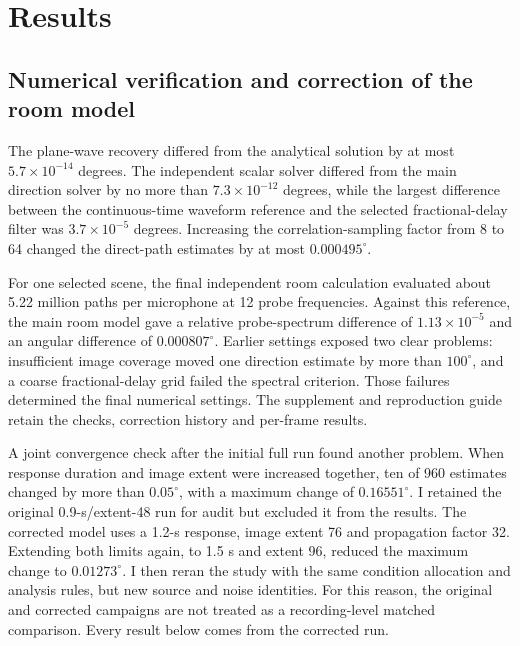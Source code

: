 \documentclass{edpsci}
\begin{document}
\section{Results}

\subsection{Numerical verification and correction of the room model}

The plane-wave recovery differed from the analytical solution by at most $5.7\times10^{-14}$ degrees. The independent scalar solver differed from the main direction solver by no more than $7.3\times10^{-12}$ degrees, while the largest difference between the continuous-time waveform reference and the selected fractional-delay filter was $3.7\times10^{-5}$ degrees. Increasing the correlation-sampling factor from 8 to 64 changed the direct-path estimates by at most $0.000495^\circ$.

For one selected scene, the final independent room calculation evaluated about 5.22 million paths per microphone at 12 probe frequencies. Against this reference, the main room model gave a relative probe-spectrum difference of $1.13\times10^{-5}$ and an angular difference of $0.000807^\circ$. Earlier settings exposed two clear problems: insufficient image coverage moved one direction estimate by more than $100^\circ$, and a coarse fractional-delay grid failed the spectral criterion. Those failures determined the final numerical settings. The supplement and reproduction guide retain the checks, correction history and per-frame results.

A joint convergence check after the initial full run found another problem. When response duration and image extent were increased together, ten of 960 estimates changed by more than $0.05^\circ$, with a maximum change of $0.16551^\circ$. I retained the original 0.9-s/extent-48 run for audit but excluded it from the results. The corrected model uses a 1.2-s response, image extent 76 and propagation factor 32. Extending both limits again, to 1.5 s and extent 96, reduced the maximum change to $0.01273^\circ$. I then reran the study with the same condition allocation and analysis rules, but new source and noise identities. For this reason, the original and corrected campaigns are not treated as a recording-level matched comparison. Every result below comes from the corrected run.
\end{document}
